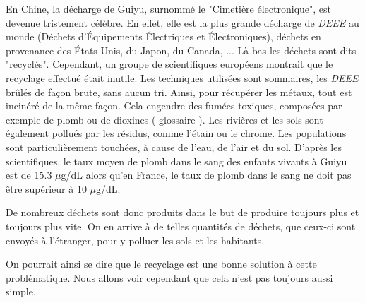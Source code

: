 \bigbreak En Chine, la décharge de Guiyu, surnommé le "Cimetière électronique", est devenue tristement célèbre. En effet, elle est la plus grande décharge de \textit{DEEE} au monde (Déchets d’Équipements Électriques et Électroniques), déchets en provenance des États-Unis, du Japon, du Canada, ... Là-bas les déchets sont dits "recyclés". Cependant, un groupe de scientifiques européens\cite{Deeechine} montrait que	le recyclage effectué était inutile. Les techniques utilisées sont sommaires, les \textit{DEEE} brûlés de façon brute, sans aucun tri. Ainsi, pour récupérer les métaux, tout est incinéré de la même façon. Cela engendre des fumées toxiques, composées par exemple de plomb ou de dioxines (-glossaire-). Les rivières et les sols sont également pollués par les résidus, comme l'étain ou le chrome. Les populations sont particulièrement touchées, à cause de l'eau, de l'air et du sol. D'après les scientifiques, le taux moyen de plomb dans le sang des enfants vivants à Guiyu est de 15.3 $\mu$g/dL alors qu'en France, le taux de plomb dans le sang ne doit pas être supérieur à 10 $\mu$g/dL. 

\bigbreak De nombreux déchets sont donc produits dans le but de produire toujours plus et toujours plus vite. On en arrive à de telles quantités de déchets, que ceux-ci sont envoyés à l'étranger, pour y polluer les sols et les habitants. 

On pourrait ainsi se dire que le recyclage est une bonne solution à cette problématique. Nous allons voir cependant que cela n'est pas toujours aussi simple.